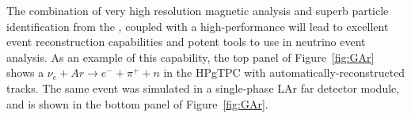 The combination of very high resolution magnetic analysis and superb particle identification from the , coupled with a high-performance  will lead to excellent event reconstruction capabilities and potent tools to use in neutrino event analysis.  
As an example of this capability, the top panel of Figure~\ref{fig:GAr} shows a $\nu_e + Ar \xrightarrow{} e^- + \pi^+ +n$ in the HPgTPC with automatically-reconstructed tracks.  The same event was simulated in a single-phase LAr far detector module, and is shown in the bottom panel of Figure~\ref{fig:GAr}.  
%
%

